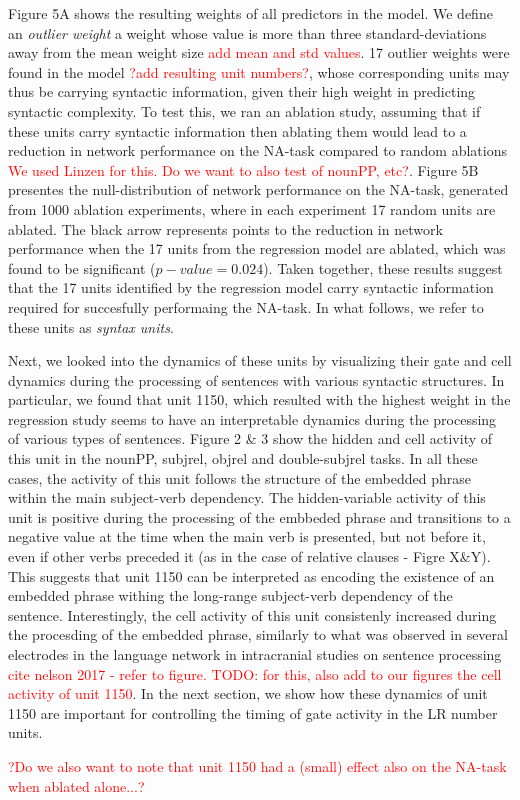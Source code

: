 Figure 5A shows the resulting weights of all predictors in the model. We define an \textit{outlier weight} a weight whose value is more than three standard-deviations away from the mean weight size \textcolor{red}{add mean and std values}. 17 outlier weights were found in the model \textcolor{red}{?add resulting unit numbers?}, whose corresponding units may thus be carrying syntactic information, given their high weight in predicting syntactic complexity. To test this, we ran an ablation study, assuming that if these units carry syntactic information then ablating them would lead to a reduction in network performance on the NA-task compared to random ablations \textcolor{red}{We used Linzen for this. Do we want to also test of nounPP, etc?}. Figure 5B presentes the null-distribution of network performance on the NA-task, generated from 1000 ablation experiments, where in each experiment 17 random units are ablated. The black arrow represents points to the reduction in network performance when the 17 units from the regression model are ablated, which was found to be significant ($p-value=0.024$). Taken together, these results suggest that the 17 units identified by the regression model carry syntactic information required for succesfully performaing the NA-task. In what follows, we refer to these units as \textit{syntax units}.

Next, we looked into the dynamics of these units by visualizing their gate and cell dynamics during the processing of sentences with various syntactic structures. In particular, we found that unit 1150, which resulted with the highest weight in the regression study seems to have an interpretable dynamics during the processing of various types of sentences. Figure 2 \& 3 show the hidden and cell activity of this unit in the nounPP, subjrel, objrel and double-subjrel tasks. In all these cases, the activity of this unit follows the structure of the embedded phrase within the main subject-verb dependency. The hidden-variable activity of this unit is positive during the processing of the embbeded phrase and transitions to a negative value at the time when the main verb is presented, but not before it, even if other verbs preceded it (as in the case of relative clauses - Figre X\&Y). This suggests that unit 1150 can be interpreted as encoding the existence of an embedded phrase withing the long-range subject-verb dependency of the sentence. Interestingly, the cell activity of this unit consistenly increased during the procesding of the embedded phrase, similarly to what was observed in several electrodes in the language network in intracranial studies on sentence processing \textcolor{red}{cite nelson 2017 - refer to figure. TODO: for this, also add to our figures the cell activity of unit 1150}. In the next section, we show how these dynamics of unit 1150 are important for controlling the timing of gate activity in the LR number units.



\textcolor{red}{?Do we also want to note that unit 1150 had a (small) effect also on the NA-task when ablated alone...?}



